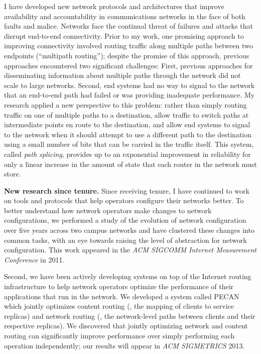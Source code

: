 I have developed new network protocols and architectures that improve
availability and accountability in communications networks in the face
of both faults and malice.  Networks face the continual threat of
failures and attacks that disrupt end-to-end connectivity.  Prior to my
work, one promising approach to improving connectivity involved routing
traffic along multiple paths between two endpoints (``multipath
routing''); despite the promise of this approach, previous approaches
encountered two significant challenges: First, previous approaches for
disseminating information about multiple paths through the network did
not scale to large networks.  Second, end systems had no way to signal
to the network that an end-to-end path had failed or was providing
inadequate performance.  My research applied a new perspective to this
problem: rather than simply routing traffic on one of multiple paths to
a destination, allow traffic to switch paths at intermediate points en
route to the destination, and allow end systems to signal to the network
when it should attempt to use a different path to the destination using
a small number of bits that can be carried in the traffic itself.  This
system, called {\em path splicing}, provides up to an exponential
improvement in reliability for only a linear increase in the amount of
state that each router in the network must store.

{\bf New research since tenure.} Since receiving tenure, I have
continued to work on tools and protocols that help operators configure
their networks better.  To better understand how network operators make
changes to network configurations, we performed a study of the evolution
of network configuration over five years across two campus networks and
have clustered these changes into common tasks, with an eye towards
raising the level of abstraction for network configuration.  This work
appeared in the {\em ACM SIGCOMM Internet Measurement Conference} in
2011.  

Second, we have been actively developing systems on top of the Internet
routing infrastructure to help network operators optimize the
performance of their applications that run in the network.  We developed
a system called PECAN which jointly optimizes content routing (\ie, the
mapping of clients to service replicas) and network routing (\ie, the
network-level paths between clients and their respective replicas).  We
discovered that jointly optimizing network and content routing can
significantly improve performance over simply performing each operation
independently; our results will appear in {\em ACM SIGMETRICS} 2013.

